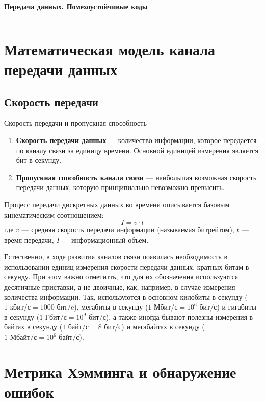 \documentclass[11pt,a4paper]{article}
\begin{document}
\begin{center}
    {\LARGE \textbf{Передача данных. Помехоустойчивые коды}}\\[0.2cm]
    \rule{\textwidth}{1pt}
\end{center}

\section{Математическая модель канала передачи данных}

\subsection{Скорость передачи}

\begin{definitionbox}{Скорость передачи и пропускная способность}
\begin{enumerate}
    \item \textbf{Скорость передачи данных} --- количество информации, которое передается по каналу связи за единицу времени. Основной единицей измерения является бит в секунду.
    \item \textbf{Пропускная способность канала связи} --- наибольшая возможная скорость передачи данных, которую принципиально невозможно превысить.
\end{enumerate}
\end{definitionbox}

Процесс передачи дискретных данных во времени описывается базовым кинематическим соотношением:
$$I = v \cdot t$$
где $v$ --- средняя скорость передачи информации (называемая битрейтом), $t$ --- время передачи, $I$ --- информационный объем.

Естественно, в ходе развития каналов связи появилась необходимость в использовании единиц измерения скорости передачи данных, кратных битам в секунду. При этом важно отметитть, что для их обозначения используются десятичные приставки, а не двоичные, как, например, в случае измерения количества информации. Так, используются в основном килобиты в секунду ($1 \text{ кбит/с} = 1000 \text{ бит/c}$), мегабиты в секунду ($1 \text{ Мбит/с} = 10^6 \text{ бит/с}$) и гигабиты в секунду ($1 \text{ Гбит/с} = 10^9 \text{ бит/с}$), а также иногда бывают полезны измерения в байтах в секунду ($1 \text{ байт/с} = 8 \text{ бит/с}$) и мегабайтах в секунду ($1 \text{ Мбайт/с} = 10^6 \text{ байт/с}$).

\section{Метрика Хэмминга и обнаружение ошибок}
\end{document}

